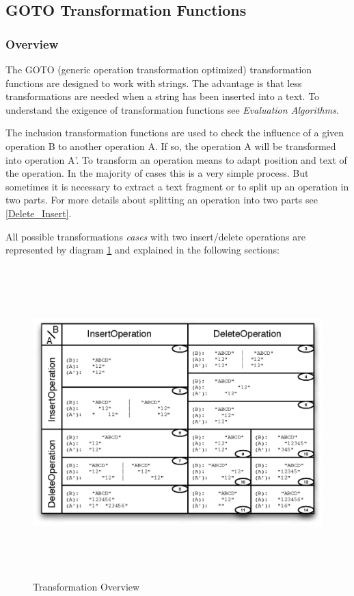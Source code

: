\newpage
\subsection{GOTO Transformation Functions}

\subsubsection{Overview}
The GOTO (generic operation transformation optimized) transformation functions are designed to work with strings. The advantage is that less transformations are needed when a string has been inserted into a text. To understand the exigence of transformation functions see \emph{Evaluation Algorithms}.

The inclusion transformation functions are used to check the influence of a given operation B to another operation A. If so, the operation A will be transformed into operation A'. To transform an operation means to adapt position and text of the operation. In the majority of cases this is a very simple process. But sometimes it is necessary to extract a text fragment or to split up an operation in two parts. For more details about splitting an operation into two parts see \ref{Delete_Insert}.

All possible transformations \emph{cases} with two insert/delete operations are represented by diagram \ref{Transformation Overview} and explained in the following sections:
\begin{figure}[H]
\centering
\includegraphics[height=12cm,width=16cm]{../../images/algo-impl/transform_overview.eps}
\caption{Transformation Overview}
\label{Transformation Overview}
\end{figure}

